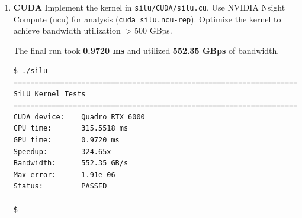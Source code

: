 \documentclass[12pt]{article}
\begin{document}
\begin{enumerate}[label=\textbf{Q\arabic*.}]
    \begin{verbatim}
$ uv run python assignment1/silu/silu_triton_test.py
CUDA device: Quadro RTX 6000

===================================================================
Correctness Test
===================================================================
Tensor Shape         Test Status          Max Diff
-------------------------------------------------------------------
(1024, 1024)         PASS                 4.77e-07
(2048, 2048)         PASS                 7.15e-07
(4096, 4096)         PASS                 9.54e-07
(8192, 8192)         PASS                 9.54e-07

===================================================================
Runtime Benchmark
===================================================================
Size                 PyTorch (ms)    Triton (ms)     Speedup
-------------------------------------------------------------------
(1024, 1024)         0.0669          0.0511          1.31
(2048, 2048)         0.2829          0.0955          2.96
(4096, 4096)         1.0753          0.2772          3.88
(8192, 8192)         4.3323          1.0179          4.26

===================================================================
Bandwidth Benchmark
===================================================================
Size                 PyTorch (GB/s)  Triton (GB/s)   Speedup
-------------------------------------------------------------------
(1024, 1024)         125.34          164.25          1.31
(2048, 2048)         118.61          351.46          2.96
(4096, 4096)         124.82          484.14          3.88
(8192, 8192)         123.92          527.45          4.26

$
    \end{verbatim}
    \item \textbf{CUDA}
    Implement the kernel in \texttt{silu/CUDA/silu.cu}. Use NVIDIA Nsight Compute (ncu) for analysis (\texttt{cuda\_silu.ncu-rep}). Optimize the kernel to achieve bandwidth utilization $>500$ GBps.

    The final run took \textbf{0.9720 ms} and utilized \textbf{552.35 GBps} of bandwidth.
    \begin{verbatim}
$ ./silu
===================================================================
SiLU Kernel Tests
===================================================================
CUDA device:    Quadro RTX 6000
CPU time:       315.5518 ms
GPU time:       0.9720 ms
Speedup:        324.65x
Bandwidth:      552.35 GB/s
Max error:      1.91e-06
Status:         PASSED

$
    \end{verbatim}
\end{enumerate}
\end{document}
